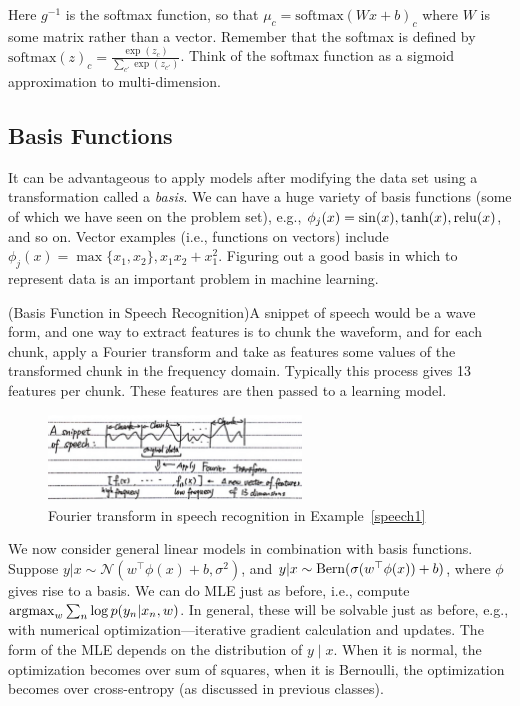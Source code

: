\documentclass{article}
\begin{document}
\begin{example}
    Here $g^{-1}$ is the softmax function, so that $\mu_c = \text{softmax}(Wx+b)_c$ where $W$ is some matrix rather than a vector.  Remember that the softmax is defined by $\text{softmax}(z)_c = \frac{\exp(z_c)}{\sum_{c'} \exp(z_{c'})}$.  Think of the softmax function as a sigmoid approximation to multi-dimension.
\end{example}

\subsection{Basis Functions}

It can be advantageous to apply models after modifying the data set using a transformation called a \emph{basis}.  We can have a huge variety of basis functions (some of which we have seen on the problem set), e.g., $\phi_j(x) = \sin(x), \tanh(x), \operatorname{relu}(x)$, and so on. Vector examples (i.e., functions on vectors) include $\phi_j(x) = \max\{x_1, x_2\}, x_1 x_2 + x_1^2$. Figuring out a good basis in which to represent data is an important problem in machine learning.

\begin{example}
\label{speech1}

  (Basis Function in Speech Recognition)A snippet of speech would be a wave form, and one way to extract features is to chunk the waveform, and for each chunk, apply a Fourier transform and take as features some values of the transformed chunk in the frequency domain.  Typically this process gives 13 features per chunk.  These features are then passed to a learning model.
    \begin{figure}[!ht]
    \centering
    \includegraphics[width = 0.6\textwidth]{speech1.jpg}
    \caption{Fourier transform in speech recognition in Example~\ref{speech1}}
    \end{figure}
\end{example}

We now consider general linear models in combination with basis functions. Suppose $y | x\sim\mathcal{N}(w^\top\phi(x) + b, \sigma^2)$, and $y | x\sim\operatorname{Bern}(\sigma(w^\top \phi(x)) + b)$, where $\phi$ gives rise to a basis. We can do MLE just as before, i.e., compute $\operatorname{argmax}_w \sum_n \log p(y_n | x_n, w)$. In general, these will be solvable just as before, e.g., with numerical optimization---iterative gradient calculation and updates. The form of the MLE depends on the distribution of $y \mid x$. When it is normal, the optimization becomes over sum of squares, when it is Bernoulli, the optimization becomes over cross-entropy (as discussed in previous classes).
\end{document}
